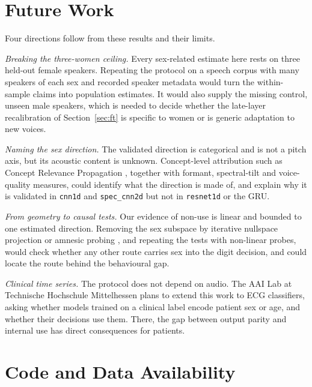 \documentclass[conference]{IEEEtran}
\begin{document}
\section{Future Work}\label{sec:future}

Four directions follow from these results and their limits.

\emph{Breaking the three-women ceiling.} Every sex-related estimate here rests
on three held-out female speakers. Repeating the protocol on a speech corpus
with many speakers of each sex and recorded speaker metadata would turn the
within-sample claims into population estimates. It would also supply the
missing control, unseen male speakers, which is needed to decide whether the
late-layer recalibration of Section~\ref{sec:ft} is specific to women or is
generic adaptation to new voices.

\emph{Naming the sex direction.} The validated direction is categorical and
is not a pitch axis, but its acoustic content is unknown. Concept-level
attribution such as Concept Relevance Propagation \cite{achtibat2023crp},
together with formant, spectral-tilt and voice-quality measures, could
identify what the direction is made of, and explain why it is validated in
\texttt{cnn1d} and \texttt{spec\_cnn2d} but not in \texttt{resnet1d} or the
GRU.

\emph{From geometry to causal tests.} Our evidence of non-use is linear and
bounded to one estimated direction. Removing the sex subspace by iterative
nullspace projection \cite{ravfogel2020inlp} or amnesic probing
\cite{elazar2021amnesic}, and repeating the tests with non-linear probes,
would check whether any other route carries sex into the digit decision, and
could locate the route behind the behavioural gap.

\emph{Clinical time series.} The protocol does not depend on audio. The AAI
Lab at Technische Hochschule Mittelhessen plans to extend this work to ECG
classifiers, asking whether models trained on a clinical label encode patient
sex or age, and whether their decisions use them. There, the gap between
output parity and internal use has direct consequences for patients.

\section*{Code and Data Availability}
\end{document}
